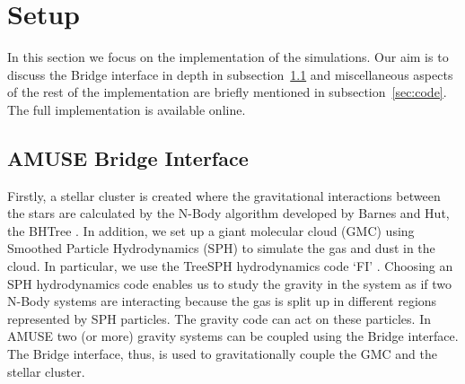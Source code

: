 \documentclass{aa}
\begin{document}
\section{Setup}
In this section we focus on the implementation of the simulations. Our aim is to discuss the Bridge interface in depth in subsection~\ref{sec:bridge} and miscellaneous aspects of the rest of the implementation are briefly mentioned in subsection~\ref{sec:code}. The full implementation is available online.

\subsection{AMUSE Bridge Interface} \label{sec:bridge}
Firstly, a stellar cluster is created where the gravitational interactions between the stars are calculated by the N-Body algorithm developed by Barnes and Hut, the BHTree \cite{1986Natur.324..446B}. In addition, we set up a giant molecular cloud (GMC) using Smoothed Particle Hydrodynamics (SPH) \citep{1977MNRAS.181..375G} to simulate the gas and dust in the cloud. In particular, we use the TreeSPH hydrodynamics code `FI' \citep{1989ApJS...70..419H, 1997A&A...325..972G, 2004A&A...422...55P, 2005PhDT........17P}. Choosing an SPH hydrodynamics code enables us to study the gravity in the system as if two N-Body systems are interacting because the gas is split up in different regions represented by SPH particles. The gravity code can act on these particles. In AMUSE two (or more) gravity systems can be coupled using the Bridge interface. The Bridge interface, thus, is used to gravitationally couple the GMC and the stellar cluster.

\end{document}
